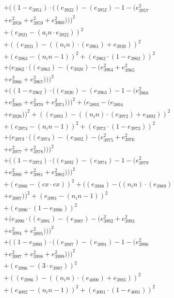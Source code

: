 \documentclass[10pt, a4paper]{article}
\begin{document}
\begin{small}
\begin{align*}
& + ((1 - e_{3951})  \cdot  ((e_{3922}) - (e_{3952}) - 1 - (e_{3957}^{2} \\
& + e_{3958}^{2} + e_{3959}^{2} + e_{3960}^{2})))^{2} \\
& + (e_{3921} - (a_in  \cdot  e_{3922}))^{2} \\
& + ((e_{3921}) - ((n_in)  \cdot  (e_{3961}) + e_{3920}))^{2} \\
& + (e_{3963} - (n_in - 1))^{2} + (e_{3962}  \cdot  (1 - e_{3962}))^{2} \\
& + (e_{3962}  \cdot  ((e_{3963}) - (e_{3920}) - (e_{3964}^{2} + e_{3965}^{2} \\
& + e_{3966}^{2} + e_{3967}^{2})))^{2} \\
& + ((1 - e_{3962})  \cdot  ((e_{3920}) - (e_{3963}) - 1 - (e_{3968}^{2} \\
& + e_{3969}^{2} + e_{3970}^{2} + e_{3971}^{2})))^{2} + (e_{3893} - (e_{3894} \\
& + e_{3920}))^{2} + ((e_{3893}) - ((n_in)  \cdot  (e_{3972}) + e_{3892}))^{2} \\
& + (e_{3974} - (n_in - 1))^{2} + (e_{3973}  \cdot  (1 - e_{3973}))^{2} \\
& + (e_{3973}  \cdot  ((e_{3974}) - (e_{3892}) - (e_{3975}^{2} + e_{3976}^{2} \\
& + e_{3977}^{2} + e_{3978}^{2})))^{2} \\
& + ((1 - e_{3973})  \cdot  ((e_{3892}) - (e_{3974}) - 1 - (e_{3979}^{2} \\
& + e_{3980}^{2} + e_{3981}^{2} + e_{3982}^{2})))^{2} \\
& + (e_{3988} - (cx  \cdot  cx))^{2} + ((e_{3988}) - ((n_in)  \cdot  (e_{3989}) \\
& + e_{3987}))^{2} + (e_{3991} - (n_in - 1))^{2} \\
& + (e_{3990}  \cdot  (1 - e_{3990}))^{2} \\
& + (e_{3990}  \cdot  ((e_{3991}) - (e_{3987}) - (e_{3992}^{2} + e_{3993}^{2} \\
& + e_{3994}^{2} + e_{3995}^{2})))^{2} \\
& + ((1 - e_{3990})  \cdot  ((e_{3987}) - (e_{3991}) - 1 - (e_{3996}^{2} \\
& + e_{3997}^{2} + e_{3998}^{2} + e_{3999}^{2})))^{2} \\
& + (e_{3986} - (3  \cdot  e_{3987}))^{2} \\
& + ((e_{3986}) - ((n_in)  \cdot  (e_{4000}) + e_{3985}))^{2} \\
& + (e_{4002} - (n_in - 1))^{2} + (e_{4001}  \cdot  (1 - e_{4001}))^{2} \\

\end{align*}
\end{small}
\end{document}
